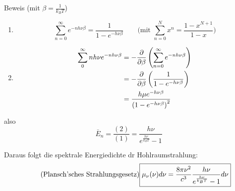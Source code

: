 \begin{erl}{Beweis}
(mit $\beta = \frac{1}{k_B T}$)
\begin{enumerate}
    \item 
    \begin{equation*}
        \sum_{n=0}^\infty e^{-n h \nu \beta}
        =
        \frac{1}{1- e^{-h\nu\beta}}\qquad \text{(mit $\sum_{n=0}^N x^n =
        \frac{1-x^{N+1}}{1-x}$)}
    \end{equation*}
    \item
    \begin{align*}
        \sum_0^{\infty} n h \nu e^{-n h \nu \beta}
        &=
        - \frac{\partial}{\partial \beta} \left( \sum_{n=0}^{\infty} e^{-n h \nu \beta} \right)
        \\
        &=
        - \frac{\partial}{\partial \beta} \left( \frac{1}{1-e^{-h \nu \beta}} \right) \\
        &=
        \frac{h \mu e^{-h \nu \beta}}{\left( 1 - e^{-h \nu \beta} \right)^2}
    \end{align*}
\end{enumerate}
also
\begin{equation*}
    \bar{E}_n = \frac{(2)}{(1)}= \frac{h\nu}{e^{\frac{h \nu}{k_B T}} -1}
\end{equation*}
\end{erl}
Daraus folgt die spektrale Energiedichte dr Hohlraumstrahlung:
\begin{equation*}
    \tag*{\text{(Plansch'sches Strahlungsgesetz)}}
    \boxed{ 
    \mu_{\nu} (\nu) d\nu =
    \frac{8 \pi \nu^2}{c^3} \frac{h \nu}{e^{\frac{h \nu}{k_B T}}-1} d\nu
    }
\end{equation*}
